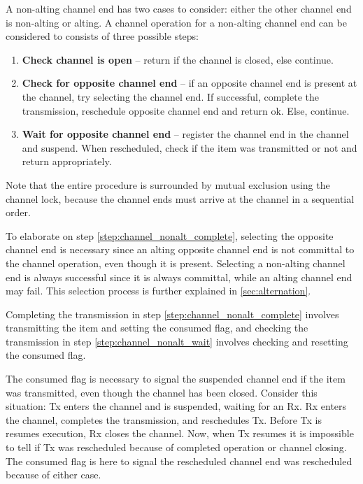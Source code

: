 A non\hyp{}alting channel end has two cases to consider: either the other channel end is non\hyp{}alting or alting. 
A channel operation for a non\hyp{}alting channel end can be considered to consists of three possible steps:

\begin{enumerate}[topsep=0em,itemsep=-1em,partopsep=0.5em,parsep=1em]
    \item \textbf{Check channel is open} -- return if the channel is closed, else continue.
    \item \textbf{Check for opposite channel end} -- if an opposite channel end is present at the channel, try selecting the channel end. If successful, complete the transmission, reschedule opposite channel end and return ok. Else, continue.
    \label{step:channel_nonalt_complete}
    \item \textbf{Wait for opposite channel end} -- register the channel end in the channel and suspend. When rescheduled, check if the item was transmitted or not and return appropriately.
    \label{step:channel_nonalt_wait}
\end{enumerate}

Note that the entire procedure is surrounded by mutual exclusion using the channel lock, because the channel ends must arrive at the channel in a sequential order.

To elaborate on step \ref{step:channel_nonalt_complete}, selecting the opposite channel end is necessary since an alting opposite channel end is not committal to the channel operation, even though it is present. Selecting a non\hyp{}alting channel end is always successful since it is always committal, while an alting channel end may fail. This selection process is further explained in \cref{sec:alternation}.

Completing the transmission in step \ref{step:channel_nonalt_complete} involves transmitting the item and setting the consumed flag, and checking the transmission in step \ref{step:channel_nonalt_wait} involves checking and resetting the consumed flag.

The consumed flag is necessary to signal the suspended channel end if the item was transmitted, even though the channel has been closed. Consider this situation: Tx enters the channel and is suspended, waiting for an Rx. Rx enters the channel, completes the transmission, and reschedules Tx. Before Tx is resumes execution, Rx closes the channel. Now, when Tx resumes it is impossible to tell if Tx was rescheduled because of completed operation or channel closing. The consumed flag is here to signal the rescheduled channel end was rescheduled because of either case.


